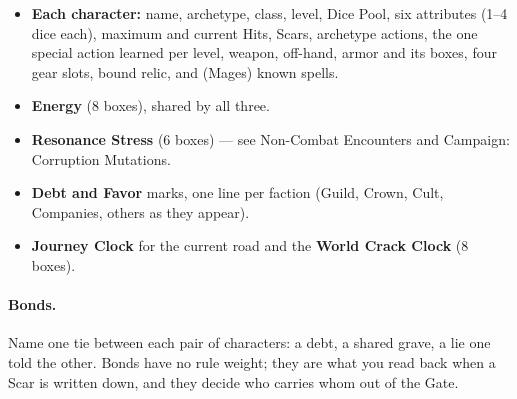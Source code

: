 \begin{itemize}
    \item \textbf{Each character:} name, archetype, class, level, Dice Pool, six attributes (1--4 dice each), maximum and current Hits, Scars, archetype actions, the one special action learned per level, weapon, off-hand, armor and its boxes, four gear slots, bound relic, and (Mages) known spells.
    \item \textbf{Energy} (8 boxes), shared by all three.
    \item \textbf{Resonance Stress} (6 boxes) --- see Non-Combat Encounters and Campaign: Corruption Mutations.
    \item \textbf{Debt and Favor} marks, one line per faction (Guild, Crown, Cult, Companies, others as they appear).
    \item \textbf{Journey Clock} for the current road and the \textbf{World Crack Clock} (8 boxes).
\end{itemize}

\paragraph{Bonds.}
Name one tie between each pair of characters: a debt, a shared grave, a lie one told the other. Bonds have no rule weight; they are what you read back when a Scar is written down, and they decide who carries whom out of the Gate.
